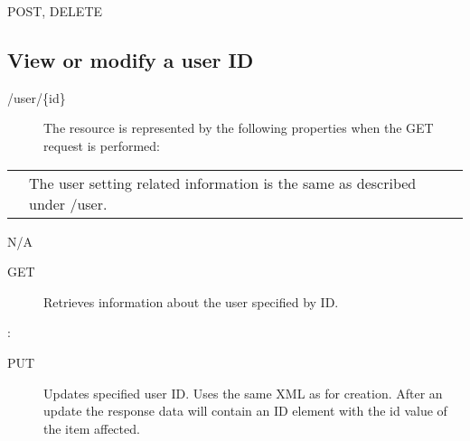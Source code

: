 \documentclass[letterpaper,10pt,english]{sphinxmanual}
\begin{document}
 POST, DELETE


\subsection{View or modify a user ID}
\label{\detokenize{restapi:view-or-modify-a-user-id}}
 /user/\{id\}
\begin{description}
\item[{}] \leavevmode
The resource is represented by the following properties when the GET request is performed:

\end{description}


\begin{savenotes}\sphinxattablestart
\centering
\begin{tabulary}{\linewidth}[t]{|T|T|}
\hline

&
\\
\hline
{}
&
The user setting related information is the same as described under /user.
\\
\hline
\end{tabulary}
\par
\sphinxattableend\end{savenotes}

 N/A
\begin{description}
\item[{ GET}] \leavevmode
Retrieves information about the user specified by ID.

\end{description}

:

\begin{sphinxVerbatim}[commandchars=\\\{\}]
\end{sphinxVerbatim}
\begin{description}
\item[{ PUT}] \leavevmode
Updates specified user ID. Uses the same XML as for creation. After an update the response data will contain an ID element with the id value of the item affected.

\end{description}
\end{document}
